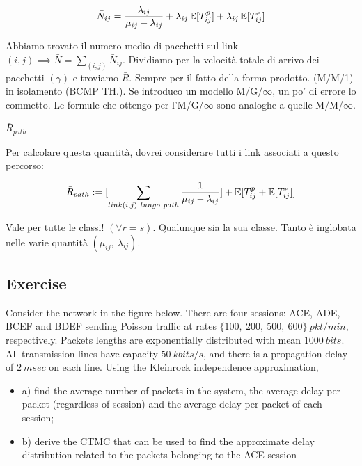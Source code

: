 \[
	\bar{N}_{ij} = \frac{\lambda_{ij}}{\mu_{ij}-\lambda_{ij}} + \lambda_{ij}\operatorname{\mathbb{E}}[T_{ij}^p] + \lambda_{ij}\operatorname{\mathbb{E}}[T_{ij}^e]
\]

Abbiamo trovato il numero medio di pacchetti sul link $(i,j) \implies \bar{N}=\sum_{(i,j)}{\bar{N}_{ij}}$. Dividiamo per la velocità totale di arrivo dei pacchetti $(\gamma)$ e troviamo $\bar{R}$. Sempre per il fatto della forma prodotto. (M/M/1) in isolamento (BCMP TH.). Se introduco un modello M/G/$\infty$, un po' di errore lo commetto. Le formule che ottengo per l'M/G/$\infty$ sono analoghe a quelle M/M/$\infty$.

\begin{thrm}{\textbf{$\bar{R}_{path}$}}

Per calcolare questa quantità, dovrei considerare tutti i link associati a questo percorso:

\[
	\bar{R}_{path} := [\sum_{link(i,j)\ lungo\ path}{\frac{1}{\mu_{ij}-\lambda_{ij}}}] + \E[T_{ij}^p + \E[T_{ij}^e]]
\]

\end{thrm}

Vale per tutte le classi! $(\forall r=s)$. Qualunque sia la sua classe. Tanto è inglobata nelle varie quantità $(\mu_{ij},\ \lambda_{ij})$. 


\subsection{Exercise}

Consider the network in the figure below. There are four sessions: ACE, ADE, BCEF and BDEF 
sending Poisson traffic at rates $\{100,\ 200,\ 500,\ 600\}\ pkt/min$, respectively. Packets lengths are 
exponentially distributed with mean $1000\ bits$. All transmission lines have capacity $50\ kbits/s$, 
and there is a propagation delay of $2\ msec$ on each line. Using the Kleinrock independence 
approximation, 

\begin{itemize}

\item{a)} find the average number of packets in the system, the average delay per packet (regardless of 
session) and the average delay per packet of each session; 
\item{b)} derive the CTMC that can be used to find the approximate delay distribution related to the 
packets belonging to the ACE session

\end{itemize}

